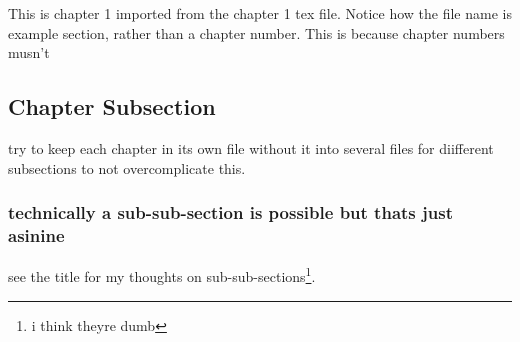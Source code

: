 This is chapter 1 imported from the chapter 1 tex file.
Notice how the file name is example section, rather than a chapter number. This is because chapter numbers musn't 

\subsection{Chapter Subsection}
try to keep each chapter in its own file without it into several files for diifferent subsections to not overcomplicate this.
\subsubsection{technically a sub-sub-section is possible but thats just asinine}
see the title for my thoughts on sub-sub-sections\footnote{i think theyre dumb}.